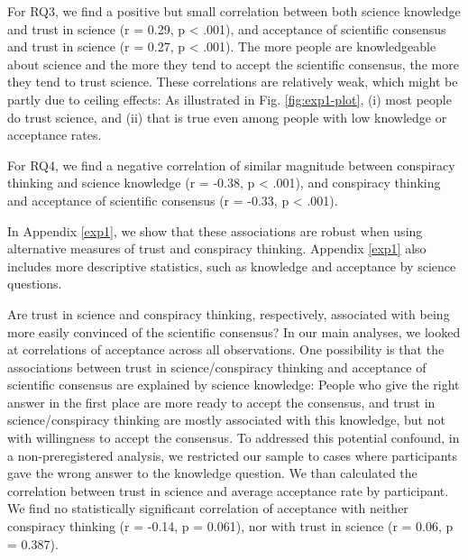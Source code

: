 \documentclass[
  doc,floatsintext]{apa6}
\begin{document}
For RQ3, we find a positive but small correlation between both science knowledge and trust in science (r = 0.29, p \textless{} .001), and acceptance of scientific consensus and trust in science (r = 0.27, p \textless{} .001). The more people are knowledgeable about science and the more they tend to accept the scientific consensus, the more they tend to trust science. These correlations are relatively weak, which might be partly due to ceiling effects: As illustrated in Fig. \ref{fig:exp1-plot}, (i) most people do trust science, and (ii) that is true even among people with low knowledge or acceptance rates.

For RQ4, we find a negative correlation of similar magnitude between conspiracy thinking and science knowledge (r = -0.38, p \textless{} .001), and conspiracy thinking and acceptance of scientific consensus (r = -0.33, p \textless{} .001).

In Appendix \ref{exp1}, we show that these associations are robust when using alternative measures of trust and conspiracy thinking. Appendix \ref{exp1} also includes more descriptive statistics, such as knowledge and acceptance by science questions.

Are trust in science and conspiracy thinking, respectively, associated with being more easily convinced of the scientific consensus? In our main analyses, we looked at correlations of acceptance across all observations. One possibility is that the associations between trust in science/conspiracy thinking and acceptance of scientific consensus are explained by science knowledge: People who give the right answer in the first place are more ready to accept the consensus, and trust in science/conspiracy thinking are mostly associated with this knowledge, but not with willingness to accept the consensus. To addressed this potential confound, in a non-preregistered analysis, we restricted our sample to cases where participants gave the wrong answer to the knowledge question. We than calculated the correlation between trust in science and average acceptance rate by participant. We find no statistically significant correlation of acceptance with neither conspiracy thinking (r = -0.14, p = 0.061), nor with trust in science (r = 0.06, p = 0.387).
\end{document}
